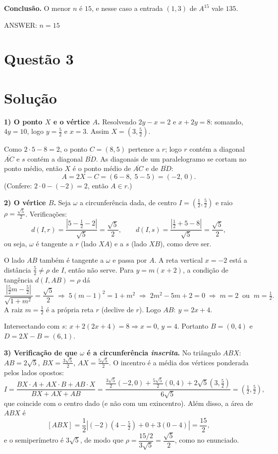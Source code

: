 \documentclass{article}%
\begin{document}
\textbf{Conclusão.} O menor $n$ é $15$, e nesse caso a entrada $(1,3)$ de $A^{15}$ vale $135$.

ANSWER: $n=15$%
\newpage%
\section*{Questão 3}

\section*{Solução}

\textbf{1) O ponto $X$ e o vértice $A$.} Resolvendo $2y-x=2$ e $x+2y=8$: somando, $4y=10$, logo $y=\tfrac52$ e $x=3$. Assim $X=\left(3,\tfrac52\right)$.

Como $2\cdot 5-8=2$, o ponto $C=(8,5)$ pertence a $r$; logo $r$ contém a diagonal $\overline{AC}$ e $s$ contém a diagonal $\overline{BD}$. As diagonais de um paralelogramo se cortam no ponto médio, então $X$ é o ponto médio de $\overline{AC}$ e de $\overline{BD}$:
\[
A=2X-C=(6-8,\;5-5)=(-2,\,0).
\]
(Confere: $2\cdot 0-(-2)=2$, então $A\in r$.)

\textbf{2) O vértice $B$.} Seja $\omega$ a circunferência dada, de centro $I=\left(\tfrac12,\tfrac52\right)$ e raio $\rho=\tfrac{\sqrt5}{2}$. Verificações:
\[
d(I,r)=\frac{\left|5-\tfrac12-2\right|}{\sqrt5}=\frac{\sqrt5}{2},\qquad
d(I,s)=\frac{\left|\tfrac12+5-8\right|}{\sqrt5}=\frac{\sqrt5}{2},
\]
ou seja, $\omega$ é tangente a $r$ (lado $XA$) e a $s$ (lado $XB$), como deve ser.

O lado $AB$ também é tangente a $\omega$ e passa por $A$. A reta vertical $x=-2$ está a distância $\tfrac52\neq\rho$ de $I$, então não serve. Para $y=m(x+2)$, a condição de tangência $d(I,AB)=\rho$ dá
\[
\frac{\left|\tfrac52 m-\tfrac52\right|}{\sqrt{1+m^2}}=\frac{\sqrt5}{2}
\;\Longrightarrow\; 5(m-1)^2=1+m^2
\;\Longrightarrow\; 2m^2-5m+2=0
\;\Longrightarrow\; m=2\ \text{ ou }\ m=\tfrac12 .
\]
A raiz $m=\tfrac12$ é a própria reta $r$ (declive de $r$). Logo $AB:\ y=2x+4$.

Intersectando com $s$: $x+2(2x+4)=8\Rightarrow x=0$, $y=4$. Portanto $B=(0,4)$ e $D=2X-B=(6,1)$.

\textbf{3) Verificação de que $\omega$ é a circunferência \emph{inscrita}.} No triângulo $ABX$: $AB=2\sqrt5$, $BX=\tfrac{3\sqrt5}{2}$, $AX=\tfrac{5\sqrt5}{2}$. O incentro é a média dos vértices ponderada pelos lados opostos:
\[
I=\frac{BX\cdot A+AX\cdot B+AB\cdot X}{BX+AX+AB}
=\frac{\tfrac{3\sqrt5}{2}(-2,0)+\tfrac{5\sqrt5}{2}(0,4)+2\sqrt5\left(3,\tfrac52\right)}{6\sqrt5}
=\left(\tfrac12,\tfrac52\right),
\]
que coincide com o centro dado (e não com um exincentro). Além disso, a área de $ABX$ é
\[
[ABX]=\frac12\left|(-2)\left(4-\tfrac52\right)+0+3(0-4)\right|=\frac{15}{2},
\]
e o semiperímetro é $3\sqrt5$, de modo que $\rho=\dfrac{15/2}{3\sqrt5}=\dfrac{\sqrt5}{2}$, como no enunciado.
\end{document}
